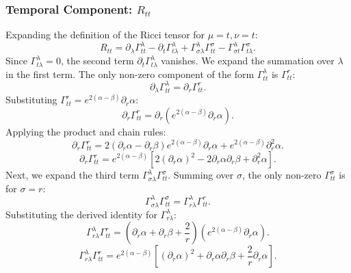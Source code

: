\documentclass[11pt, a4paper]{report}
\begin{document}
\subsubsection{Temporal Component: $R_{tt}$}
Expanding the definition of the Ricci tensor for $\mu=t, \nu=t$:
\begin{equation}
R_{tt} = \partial_\lambda \Gamma^\lambda_{tt} - \partial_t \Gamma^\lambda_{t\lambda} + \Gamma^\lambda_{\sigma\lambda} \Gamma^\sigma_{tt} - \Gamma^\lambda_{\sigma t} \Gamma^\sigma_{t\lambda}.
\end{equation}
Since $\Gamma^\lambda_{t\lambda} = 0$, the second term $\partial_t \Gamma^\lambda_{t\lambda}$ vanishes. We expand the summation over $\lambda$ in the first term. The only non-zero component of the form $\Gamma^\lambda_{tt}$ is $\Gamma^r_{tt}$:
\begin{equation}
\partial_\lambda \Gamma^\lambda_{tt} = \partial_r \Gamma^r_{tt}.
\end{equation}
Substituting $\Gamma^r_{tt} = e^{2(\alpha-\beta)} \partial_r\alpha$:
\begin{equation}
\partial_r \Gamma^r_{tt} = \partial_r \left( e^{2(\alpha-\beta)} \partial_r\alpha \right).
\end{equation}
Applying the product and chain rules:
\begin{equation}
\partial_r \Gamma^r_{tt} = 2(\partial_r\alpha - \partial_r\beta)e^{2(\alpha-\beta)}\partial_r\alpha + e^{2(\alpha-\beta)}\partial_r^2\alpha.
\end{equation}
\begin{equation}
\partial_r \Gamma^r_{tt} = e^{2(\alpha-\beta)} \left[ 2(\partial_r\alpha)^2 - 2\partial_r\alpha\partial_r\beta + \partial_r^2\alpha \right].
\end{equation}
Next, we expand the third term $\Gamma^\lambda_{\sigma\lambda} \Gamma^\sigma_{tt}$. Summing over $\sigma$, the only non-zero $\Gamma^\sigma_{tt}$ is for $\sigma=r$:
\begin{equation}
\Gamma^\lambda_{\sigma\lambda} \Gamma^\sigma_{tt} = \Gamma^\lambda_{r\lambda} \Gamma^r_{tt}.
\end{equation}
Substituting the derived identity for $\Gamma^\lambda_{r\lambda}$:
\begin{equation}
\Gamma^\lambda_{r\lambda} \Gamma^r_{tt} = \left( \partial_r\alpha + \partial_r\beta + \frac{2}{r} \right) \left( e^{2(\alpha-\beta)} \partial_r\alpha \right).
\end{equation}
\begin{equation}
\Gamma^\lambda_{r\lambda} \Gamma^r_{tt} = e^{2(\alpha-\beta)} \left[ (\partial_r\alpha)^2 + \partial_r\alpha\partial_r\beta + \frac{2}{r}\partial_r\alpha \right].
\end{equation}
\end{document}
